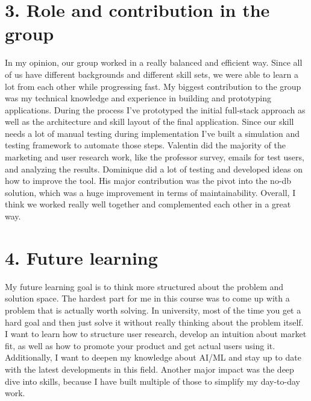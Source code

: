 \documentclass[11pt,a4paper]{article}
\begin{document}
\section*{3. Role and contribution in the group}
In my opinion, our group worked in a really balanced and efficient way. Since all of us have different backgrounds and different skill sets, 
we were able to learn a lot from each other while progressing fast. 
My biggest contribution to the group was my technical knowledge and experience in building and prototyping applications. During the process 
I've prototyped the initial full-stack approach as well as the architecture and skill layout 
of the final application. Since our skill needs a lot of manual testing during implementation 
I've built a simulation and testing framework to automate those steps. Valentin did the majority 
of the marketing and user research work, like the professor survey, emails for test users, and analyzing the results. Dominique did a lot of testing and 
developed ideas on how to improve the tool. His major contribution was the pivot into the no-db solution, which was a huge improvement in terms of 
maintainability. Overall, I think we worked really well together and complemented each other in a great way.  



\section*{4. Future learning}
My future learning goal is to think more structured about the problem and solution space. The hardest part for me in this course was to come up with a problem that is actually worth solving. In university, most of the time
you get a hard goal and then just solve it without really thinking about the problem itself. 
I want to learn how to structure user research, develop an intuition about market fit, as well as how to promote your product and get actual users using it.
Additionally, I want to deepen my knowledge about AI/ML and stay up to date with the latest developments in this field. Another major impact was the deep dive into skills, because I have built multiple of those to simplify my day-to-day work.
\end{document}
